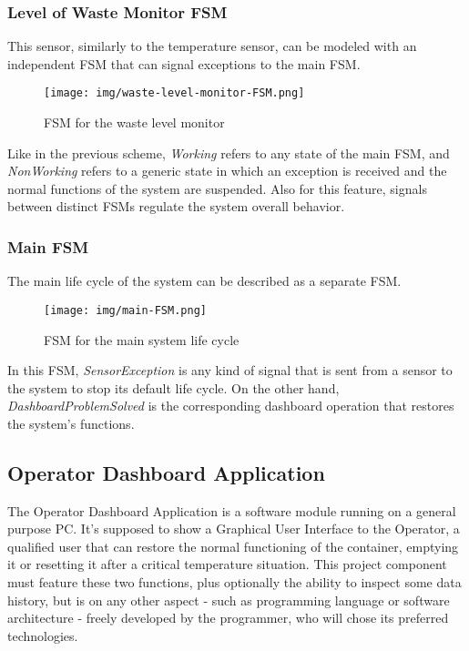 \documentclass[a4paper,12pt]{report}
\begin{document}
	\subsubsection{Level of Waste Monitor FSM}
	This sensor, similarly to the temperature sensor, can be modeled with an independent FSM that can signal exceptions to the main FSM. 
	\begin{figure}[H]
		\centering{}
		\texttt{[image: img/waste-level-monitor-FSM.png]}
		\caption{FSM for the waste level monitor}
		\label{img:waste-level-FSM}
	\end{figure}
	Like in the previous scheme, \emph{Working} refers to any state of the main FSM, and \emph{NonWorking} refers to a generic state in which an exception is received and the normal functions of the system are suspended. Also for this feature, signals between distinct FSMs regulate the system overall behavior.
	
	\subsubsection{Main FSM}
	The main life cycle of the system can be described as a separate FSM.
	\begin{figure}[H]
		\centering{}
		\texttt{[image: img/main-FSM.png]}
		\caption{FSM for the main system life cycle}
		\label{img:main-FSM}
	\end{figure}
	In this FSM, \emph{SensorException} is any kind of signal that is sent from a sensor to the system to stop its default life cycle. On the other hand, \emph{DashboardProblemSolved} is the corresponding dashboard operation that restores the system's functions.
	
	\subsection{Operator Dashboard Application}
	The Operator Dashboard Application is a software module running on a general purpose PC. It's supposed to show a Graphical User Interface to the Operator, a qualified user that can restore the normal functioning of the container, emptying it or resetting it after a critical temperature situation.\newline
	This project component must feature these two functions, plus optionally the ability to inspect some data history, but is on any other aspect - such as programming language or software architecture - freely developed by the programmer, who will chose its preferred technologies.
	
\end{document}
